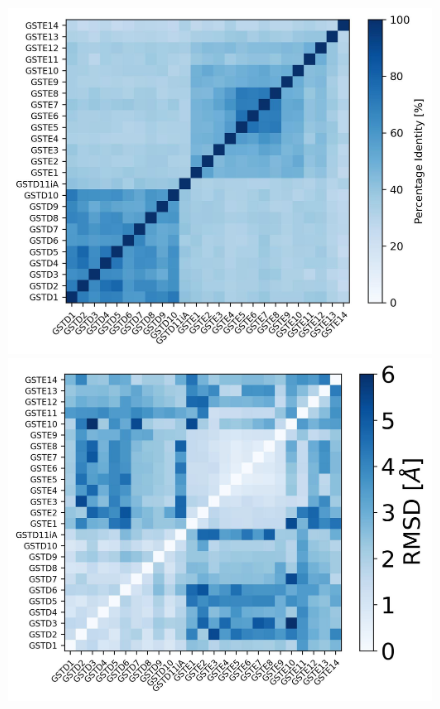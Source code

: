 \begin{figure}[h!]
\begin{minipage}{.32\linewidth}
		\includegraphics[width = .99\textwidth]{figures/PercentID_matrix}
	\end{minipage}
	\begin{minipage}{.32\linewidth}
		\includegraphics[width = .99\textwidth]{figures/RMSD_matrix}
	\end{minipage}
	\begin{minipage}{.32\linewidth}

\end{minipage}
\end{figure}
